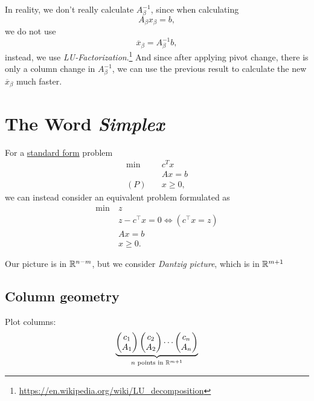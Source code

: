 \begin{note}
	In reality, we don't really calculate \(A^{-1}_{\beta}\), since when calculating
	\[
		A_{\beta}x_{\beta} = b,
	\]
	we do not use
	\[
		\overline{x}_{\beta} = A^{-1}_{\beta}b,
	\]
	instead, we use \emph{LU-Factorization}.\footnote{\url{https://en.wikipedia.org/wiki/LU_decomposition}} And since after applying pivot change,
	there is only a column change in \(A^{-1}_{\beta}\), we can use the previous result
	to calculate the new \(\overline{x}_{\beta}\) much faster.
\end{note}

\section{The Word \emph{Simplex}}
For a \hyperref[def:standard-form]{standard form} problem
\begin{align*}
	\min~    & c^Tx     \\
	         & Ax = b   \\
	(P)\quad & x\geq 0,
\end{align*}
we can instead consider an equivalent problem formulated as
\begin{align*}
	\min~ & z                                        \\
	      & z - c^{\top} x = 0 \iff (c^{\top} x = z) \\
	      & Ax = b                                   \\
	      & x\geq 0.
\end{align*}

\begin{prev}
	Our picture is in \(\mathbb{\MakeUppercase{R}}^{n-m}\), but we consider \emph{Dantzig picture}, which is in \(\mathbb{\MakeUppercase{R}}^{m+1}\)
\end{prev}

\subsection{Column geometry}
Plot columns:
\[
	\underbrace{
		\begin{pmatrix}
			c_1 \\
			A_1 \\
		\end{pmatrix}
		\begin{pmatrix}
			c_2 \\
			A_2 \\
		\end{pmatrix}
		\cdots
		\begin{pmatrix}
			c_n \\
			A_n \\
		\end{pmatrix}}_{n \text{ points in }\mathbb{\MakeUppercase{R}}^{m+1}}
\]

